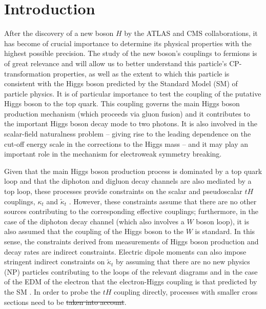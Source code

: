 \documentclass[aps,preprint,tightenlines,floatfix,superscriptaddress,nofootinbib,showpacs]{revtex4-1}
\def\kp{\kappa_t}
\def\kpt{\tilde{\kappa}_t}
\providecommand{\DIFadd}[1]{{\protect\color{blue}\uwave{#1}}} %
\providecommand{\DIFdel}[1]{{\protect\color{red}\sout{#1}}}                      %
\providecommand{\DIFaddbegin}{} %
\providecommand{\DIFaddend}{} %
\providecommand{\DIFdelbegin}{} %
\providecommand{\DIFdelend}{} %
\begin{document}
\section{Introduction}
\label{sec1}
After the discovery of a new boson $H$ by the ATLAS \cite{atlasH} and
CMS \cite{cmsH} collaborations, it has become of crucial importance
 to determine its physical
 properties with the highest possible precision.
 The study of the new boson's couplings
 to fermions is of great relevance
 and will allow us to better understand this particle's $\mathrm{CP}$-transformation
   properties, as well as the
extent to which this particle is consistent with the Higgs boson
predicted by the Standard Model (SM) of particle physics.
It is of particular importance to test the coupling of the putative 
Higgs boson to
the top quark.  This coupling governs
the main Higgs boson production mechanism (which proceeds via gluon fusion)
and it contributes to the
important Higgs boson decay mode to two photons.
It is also
involved in the scalar-field naturalness problem -- giving rise to the
leading dependence on the cut-off energy scale in the corrections to
the Higgs mass -- and it may play an important role in the mechanism for electroweak symmetry breaking.\par

Given that the main Higgs boson production
process is dominated by a top quark loop and that
the diphoton and digluon decay channels are also mediated by a top
loop, these processes provide constraints on the scalar and
pseudoscalar $tH$ couplings, $\kp$ and $\kpt$
\cite{constraints1,constraints2, constraints3,constraints4}.
     However,
these constraints assume that there are no other sources contributing
to the corresponding effective couplings; furthermore, in the case of the
diphoton decay channel (which also involves a $W$ boson loop), it is also
assumed that the
coupling of the Higgs boson to the $W$ is standard. In this sense, the
constraints derived from measurements of Higgs boson production and decay rates
 are indirect constraints. Electric dipole moments can also
impose stringent indirect constraints on $\kpt$ by assuming that there
are no new physics (NP) particles contributing to the loops of the
relevant diagrams and in the case of the EDM of the electron that the 
electron-Higgs coupling is that
predicted by the SM \cite{constraints1,edm}. In order to probe
the $tH$ coupling directly, processes with smaller cross sections need
to be \DIFdelbegin \DIFdel{taken into account}\DIFdelend \DIFaddbegin \DIFadd{considered}\DIFaddend .  \par
\end{document}
